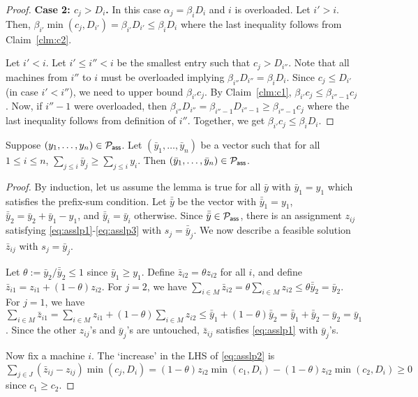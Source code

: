 \documentclass{article}[11pt]
\begin{document}
\begin{proof}
\noindent
{\bf Case 2: $c_j > D_i$.} In this case $\alpha_j = \beta_iD_i$ and $i$ is overloaded. Let $i' > i$. Then, $\beta_{i'}\min(c_j,D_{i'}) = \beta_{i'}D_{i'} \leq \beta_iD_i$ where the last inequality follows from Claim~\ref{clm:c2}.


Let $i' < i$. Let $i'\leq i'' < i$ be the smallest entry such that $c_j > D_{i''}$. Note that all machines from $i''$ to $i$ must be overloaded implying $\beta_{i''}D_{i''} = \beta_iD_i$.
Since $c_j \leq D_{i'}$ (in case $i' < i''$), we need to upper bound $\beta_{i'}c_j$. 
By Claim~\ref{clm:c1}, $\beta_{i'}c_j \leq \beta_{i''-1}c_j$. Now, if $i''-1$ were overloaded, 
then $\beta_{i''}D_{i''} = \beta_{i''-1}D_{i''-1} \geq \beta_{i''-1}c_j$ where the last inequality follows from definition of $i''$. Together, we get $\beta_{i'}c_j \leq \beta_iD_i$.
\end{proof}
\def\y{\bar{y}}
\def\z{\bar{z}}
\def\yy{\bar{\bar{y}}}

\begin{lemma}
Suppose $(y_1,\ldots,y_n)\in {\cal P}_\mathsf{ass}$. Let $(\y_1,\ldots,\y_n)$ be a vector such that for all $1\leq i\leq n$, $\sum_{j\leq i} \y_j \geq \sum_{j\leq i} y_i$. Then
$(\y_1,\ldots,\y_n)\in \calP_{\mathsf{ass}}$.
\end{lemma}
\begin{proof}
By induction, let us assume the lemma is true for all $\y$ with $\y_1 = y_1$ which satisfies the prefix-sum condition.
Let $\yy$ be the vector with $\yy_1 = y_1$, $\yy_2 = \y_2 + \y_1 - y_1$, and $\yy_i = \y_i$ otherwise.
Since $\yy\in \calP_\mathsf{ass}$, there is an assignment $z_{ij}$ satisfying \eqref{eq:asslp1}-\eqref{eq:asslp3} with $s_j = \yy_j$.
We now describe a feasible solution $\z_{ij}$ with $s_j = \y_j$.

Let $\theta := \y_2/\yy_2 \le 1$ since $\y_1 \geq y_1$. Define $\z_{i2} = \theta z_{i2}$ for all $i$, and define $\z_{i1} = z_{i1} + (1-\theta)z_{i2}$.
For $j=2$, we have $\sum_{i\in M} \z_{i2} = \theta \sum_{i\in M} z_{i2} \leq \theta \yy_2 = \y_2$.
For $j=1$, we have $\sum_{i\in M} \z_{i1} = \sum_{i\in M} z_{i1} + (1-\theta) \sum_{i\in M} z_{i2} \leq \yy_1 + (1-\theta)\yy_2 = \yy_1 +\yy_2 - \y_2 = \y_1$. 
Since the other $z_{ij}$'s and $\y_j$'s are untouched, $\z_{ij}$ satisfies \eqref{eq:asslp1} with $\y_j$'s.

Now fix a machine $i$. The `increase' in the LHS of \eqref{eq:asslp2} is  $\sum_{j\in J} (\z_{ij} - z_{ij}) \min(c_j,D_i) = (1-\theta)z_{i2}\min(c_1,D_i) -  (1-\theta) z_{i2}\min(c_2,D_i) \geq 0$ since $c_1 \geq c_2$.

\end{proof}
\end{document}
